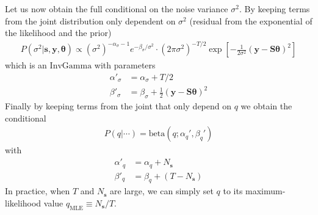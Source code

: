 \documentclass{article}
\theoremstyle{remark}
\begin{document}
Let us now obtain the full conditional on the noise variance $\sigma^2$. By keeping terms from the joint distribution only dependent on $\sigma^2$ (residual from the exponential of the likelihood and the prior)
\begin{align}
    P(\sigma^2| \bm{s},\bm{y},\bm\theta) \propto (\sigma^2)^{-\alpha_\sigma-1}e^{-\beta_\sigma/\sigma^2}\cdot (2\pi\sigma^2)^{-T/2}\exp\left[-\frac{1}{2\sigma^2}(\bm y-\bm{S\theta})^2\right] 
\end{align}
which is an $\mathrm{InvGamma}$ with parameters
\begin{align}
    \alpha'_{\sigma} &= \alpha_\sigma+T/2\\
    \beta'_\sigma &= \beta_\sigma+\frac{1}{2}(\bm y - \bm{S\theta})^2
\end{align}
Finally by keeping terms from the joint that only depend on $q$ we obtain the conditional
\begin{align}
    P(q|\cdots) = \mathrm{beta}(q;\alpha_q',\beta_q')
\end{align}
with 
\begin{align}
    \alpha'_q &= \alpha_q+N_{\bm{s}}\\
    \beta'_q &=\beta_q+(T-N_{\bm{s}})
\end{align}
In practice, when $T$ and $N_{\bm s}$ are large, we can simply set $q$ to its maximum-likelihood value $q_\mathrm{MLE}\equiv N_{\bm s}/T$.
\end{document}
